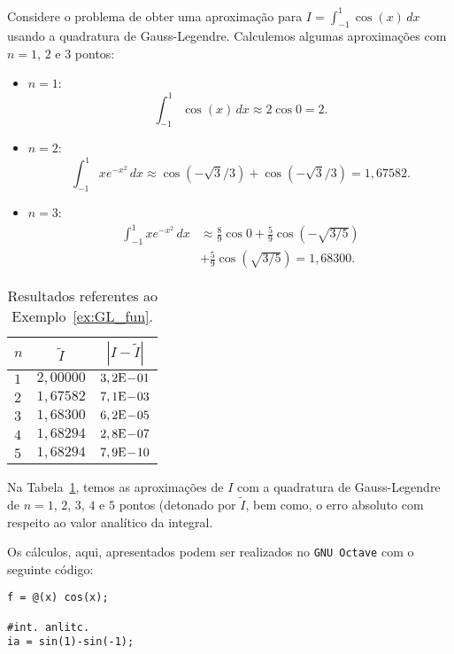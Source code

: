 \begin{ex}\label{ex:GL_fun}
  Considere o problema de obter uma aproximação para $I = \int_{-1}^1 \cos(x)\,dx$ usando a quadratura de Gauss-Legendre. Calculemos algumas aproximações com $n=1$, $2$ e $3$ pontos:
  \begin{itemize}
  \item $n=1$:
    \begin{equation}
      \int_{-1}^1 \cos(x)\,dx \approx 2 \cos 0 = 2.
    \end{equation}
  \item $n=2$:
    \begin{equation}
      \int_{-1}^1 xe^{-x^2}\,dx \approx \cos(-\sqrt{3}/3) + \cos(-\sqrt{3}/3) = 1,67582.
    \end{equation}
  \item $n=3$:
    \begin{align}
      \int_{-1}^1 xe^{-x^2}\,dx &\approx \frac{8}{9}\cos 0 + \frac{5}{9}\cos(-\sqrt{3/5}) \nonumber\\
      &+ \frac{5}{9}\cos(\sqrt{3/5}) = 1,68300.
    \end{align}
  \end{itemize}

\begin{table}[h!]
  \centering
  \begin{tabular}{lcc}
    $n$ & $\tilde{I}$ & $|I-\tilde{I}|$ \\\hline
    $1$ & $2,00000$ & $3,2\mathrm{E}\!-\!01$ \\
    $2$ & $1,67582$ & $7,1\mathrm{E}\!-\!03$ \\
    $3$ & $1,68300$ & $6,2\mathrm{E}\!-\!05$ \\
    $4$ & $1,68294$ & $2,8\mathrm{E}\!-\!07$ \\
    $5$ & $1,68294$ & $7,9\mathrm{E}\!-\!10$ \\\hline
  \end{tabular}
  \caption{Resultados referentes ao Exemplo~\ref{ex:GL_fun}.}
  \label{tab:ex_GL_fun}
\end{table}

Na Tabela~\ref{tab:ex_GL_fun}, temos as aproximações de $I$ com a quadratura de Gauss-Legendre de $n=1$, $2$, $3$, $4$ e $5$ pontos (detonado por $\tilde{I}$, bem como, o erro absoluto com respeito ao valor analítico da integral.

\ifisoctave
Os cálculos, aqui, apresentados podem ser realizados no \verb+GNU Octave+ com o seguinte código:
\begin{verbatim}
f = @(x) cos(x);

#int. anlitc.
ia = sin(1)-sin(-1);


\end{verbatim}
\end{ex}
